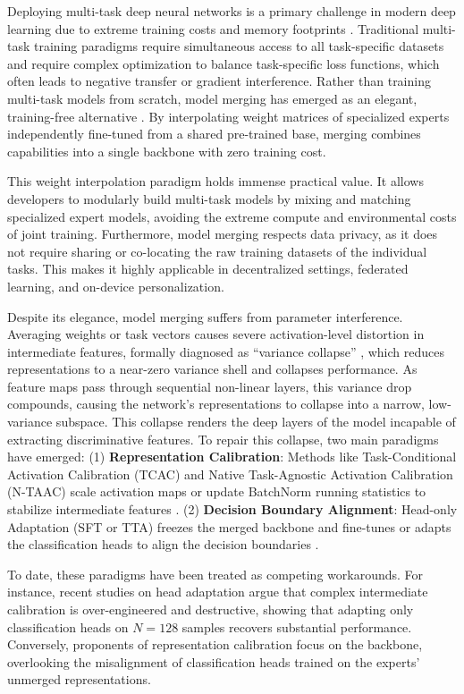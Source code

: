 \documentclass{article}
\theoremstyle{plain}
\theoremstyle{definition}
\theoremstyle{remark}
\begin{document}
Deploying multi-task deep neural networks is a primary challenge in modern deep learning due to extreme training costs and memory footprints \cite{caruana1997multitask, sener2018multi}. Traditional multi-task training paradigms require simultaneous access to all task-specific datasets and require complex optimization to balance task-specific loss functions, which often leads to negative transfer or gradient interference. Rather than training multi-task models from scratch, model merging has emerged as an elegant, training-free alternative \cite{ilharco2022editing, yadav2023ties, yu2024dare, wortsman2022model}. By interpolating weight matrices of specialized experts independently fine-tuned from a shared pre-trained base, merging combines capabilities into a single backbone with zero training cost.

This weight interpolation paradigm holds immense practical value. It allows developers to modularly build multi-task models by mixing and matching specialized expert models, avoiding the extreme compute and environmental costs of joint training. Furthermore, model merging respects data privacy, as it does not require sharing or co-locating the raw training datasets of the individual tasks. This makes it highly applicable in decentralized settings, federated learning, and on-device personalization.

Despite its elegance, model merging suffers from parameter interference. Averaging weights or task vectors causes severe activation-level distortion in intermediate features, formally diagnosed as ``variance collapse'' \cite{jordan2022repair}, which reduces representations to a near-zero variance shell and collapses performance. As feature maps pass through sequential non-linear layers, this variance drop compounds, causing the network's representations to collapse into a narrow, low-variance subspace. This collapse renders the deep layers of the model incapable of extracting discriminative features. To repair this collapse, two main paradigms have emerged:
(1) \textbf{Representation Calibration}: Methods like Task-Conditional Activation Calibration (TCAC) and Native Task-Agnostic Activation Calibration (N-TAAC) scale activation maps or update BatchNorm running statistics to stabilize intermediate features \cite{jordan2022repair}.
(2) \textbf{Decision Boundary Alignment}: Head-only Adaptation (SFT or TTA) freezes the merged backbone and fine-tunes or adapts the classification heads to align the decision boundaries \cite{zaken2022bitfit}.

To date, these paradigms have been treated as competing workarounds. For instance, recent studies on head adaptation \cite{zaken2022bitfit} argue that complex intermediate calibration is over-engineered and destructive, showing that adapting only classification heads on $N=128$ samples recovers substantial performance. Conversely, proponents of representation calibration focus on the backbone, overlooking the misalignment of classification heads trained on the experts' unmerged representations.
\end{document}
